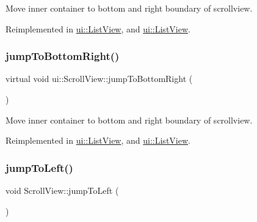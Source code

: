 Move inner container to bottom and right boundary of scrollview. 

Reimplemented in \hyperlink{classui_1_1ListView_a1147d7b2ad27eb3101bb6e31d1fe73e1}{ui\+::\+List\+View}, and \hyperlink{classui_1_1ListView_ac76553a765cff9931a56c75c75484650}{ui\+::\+List\+View}.

\mbox{\label{classui_1_1ScrollView_a9fa6eb22d20be5d5e4230ff21570bffb}} 
\subsubsection{\texorpdfstring{jump\+To\+Bottom\+Right()}{jumpToBottomRight()}\hspace{0.1cm}{\footnotesize\ttfamily [2/2]}}
{\footnotesize\ttfamily virtual void ui\+::\+Scroll\+View\+::jump\+To\+Bottom\+Right (\begin{DoxyParamCaption}{ }\end{DoxyParamCaption})\hspace{0.3cm}{\ttfamily [virtual]}}

Move inner container to bottom and right boundary of scrollview. 

Reimplemented in \hyperlink{classui_1_1ListView_a1147d7b2ad27eb3101bb6e31d1fe73e1}{ui\+::\+List\+View}, and \hyperlink{classui_1_1ListView_ac76553a765cff9931a56c75c75484650}{ui\+::\+List\+View}.

\mbox{\label{classui_1_1ScrollView_a997d4610191286c00079f1b75062f5a5}} 
\subsubsection{\texorpdfstring{jump\+To\+Left()}{jumpToLeft()}\hspace{0.1cm}{\footnotesize\ttfamily [1/2]}}
{\footnotesize\ttfamily void Scroll\+View\+::jump\+To\+Left (\begin{DoxyParamCaption}{ }\end{DoxyParamCaption})\hspace{0.3cm}{\ttfamily [virtual]}}

